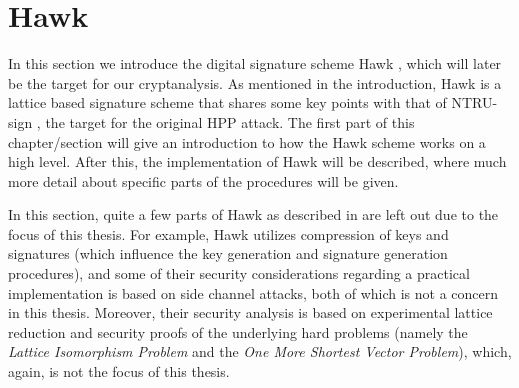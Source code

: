 \section{Hawk}
In this section we introduce the digital signature scheme Hawk \cite{HawkSpec24}, which will later be the target for our cryptanalysis.
As mentioned in the introduction, Hawk is a lattice based signature scheme that shares some key points with that of NTRU-sign \cite{HHPSW03}, the target for the original HPP attack.
The first part of this chapter/section will give an introduction to how the Hawk scheme works on a high level. After this, the implementation of Hawk will be described, where much more detail about 
specific parts of the procedures will be given.

In this section, quite a few parts of Hawk as described in \cite{HawkSpec24} are left out due to the focus of this thesis. For example, Hawk utilizes compression of keys and signatures 
(which influence the key generation and signature generation procedures),
and some of their security considerations regarding a practical implementation is based on side channel attacks, both of which is not a concern in this thesis.
Moreover, their security analysis is based on experimental lattice reduction and security proofs of the underlying hard problems (namely the \textit{Lattice Isomorphism Problem} and 
the \textit{One More Shortest Vector Problem}), which, again, is not the focus of this thesis. 

